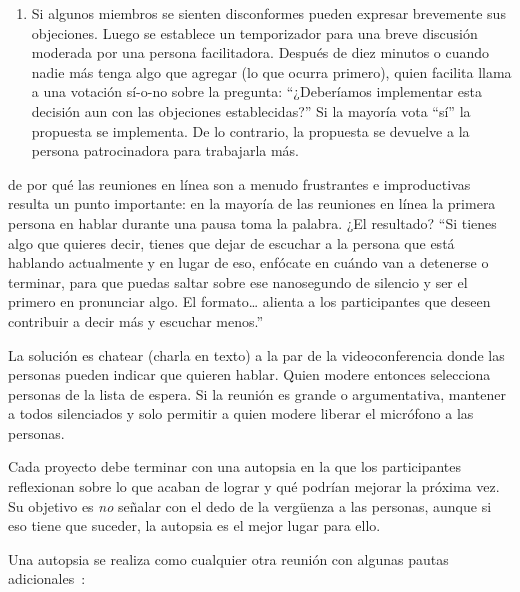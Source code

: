 \begin{enumerate}
\item
  Si algunos miembros se sienten disconformes pueden expresar brevemente sus objeciones.
  Luego se establece un temporizador para una breve discusión moderada por una persona facilitadora.
  Después de diez minutos o cuando nadie más tenga algo que agregar (lo que ocurra primero),
  quien facilita llama a una votación sí-o-no sobre la pregunta:
  ``¿Deberíamos implementar esta decisión aun con las objeciones establecidas?''
  Si la mayoría vota ``sí'' la propuesta se implementa.
  De lo contrario, la propuesta se devuelve a la persona patrocinadora para trabajarla más.

\end{enumerate}


de por qué las reuniones en línea son a menudo frustrantes e improductivas 
resulta un punto importante:
en la mayoría de las reuniones en línea
la primera persona en hablar durante una pausa toma la palabra.
¿El resultado?
``Si tienes algo que quieres decir,
tienes que dejar de escuchar a la persona que está hablando actualmente
y en lugar de eso, enfócate en cuándo van a detenerse o terminar, 
para que puedas saltar sobre ese nanosegundo de silencio y ser el primero en pronunciar algo.
El formato{\ldots} alienta a los participantes que deseen contribuir a decir más y escuchar menos.''

La solución es chatear (charla en texto) a la par de la videoconferencia
donde las personas pueden indicar que quieren hablar.
Quien modere entonces selecciona personas de la lista de espera.
Si la reunión es grande o argumentativa,
mantener a todos silenciados
y solo permitir a quien modere liberar el micrófono a las personas.


Cada proyecto debe terminar con una autopsia
en la que los participantes reflexionan sobre lo que acaban de lograr
y qué podrían mejorar la próxima vez.
Su objetivo es \emph{no} señalar con el dedo de la vergüenza a las personas,
aunque si eso tiene que suceder,
la autopsia es el mejor lugar para ello.

Una autopsia se realiza como cualquier otra reunión
con algunas pautas adicionales~\cite{Derb2006}:

